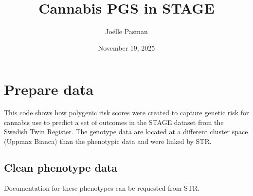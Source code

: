 \documentclass[
]{article}
\title{Cannabis PGS in STAGE}
\author{Joëlle Pasman}
\date{November 19, 2025}
\begin{document}
\maketitle

\hypertarget{prepare-data}{%
\section{Prepare data}\label{prepare-data}}

This code shows how polygenic risk scores were created to capture
genetic risk for cannabis use to predict a set of outcomes in the STAGE
dataset from the Swedish Twin Register. The genotype data are located at
a different cluster space (Uppmax Bianca) than the phenotypic data and
were linked by STR.

\hypertarget{clean-phenotype-data}{%
\subsection{Clean phenotype data}\label{clean-phenotype-data}}

Documentation for these phenotypes can be requested from STR.
\end{document}

